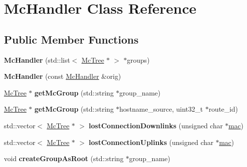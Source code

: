 \hypertarget{classMcHandler}{\section{Mc\-Handler Class Reference}
\label{classMcHandler}
}
\subsection*{Public Member Functions}
\begin{DoxyCompactItemize}
\item 
\hypertarget{classMcHandler_ac3dbc09dc2c3b152e87c59d9570430d8}{{\bfseries Mc\-Handler} (std\-::list$<$ \hyperlink{classMcTree}{Mc\-Tree} $\ast$ $>$ $\ast$groups)}\label{classMcHandler_ac3dbc09dc2c3b152e87c59d9570430d8}

\item 
\hypertarget{classMcHandler_a1f172f102e50907d784ffa319768ded1}{{\bfseries Mc\-Handler} (const \hyperlink{classMcHandler}{Mc\-Handler} \&orig)}\label{classMcHandler_a1f172f102e50907d784ffa319768ded1}

\item 
\hypertarget{classMcHandler_ae675a3ae1b41393e28c4850f76327212}{\hyperlink{classMcTree}{Mc\-Tree} $\ast$ {\bfseries get\-Mc\-Group} (std\-::string $\ast$group\-\_\-name)}\label{classMcHandler_ae675a3ae1b41393e28c4850f76327212}

\item 
\hypertarget{classMcHandler_aa3b39782c75c70c7eede6aed094d3099}{\hyperlink{classMcTree}{Mc\-Tree} $\ast$ {\bfseries get\-Mc\-Group} (std\-::string $\ast$hostname\-\_\-source, uint32\-\_\-t $\ast$route\-\_\-id)}\label{classMcHandler_aa3b39782c75c70c7eede6aed094d3099}

\item 
\hypertarget{classMcHandler_af2bfeebf2808b3242120efabd69ee41e}{std\-::vector$<$ \hyperlink{classMcTree}{Mc\-Tree} $\ast$ $>$ {\bfseries lost\-Connection\-Downlinks} (unsigned char $\ast$\hyperlink{structmac}{mac})}\label{classMcHandler_af2bfeebf2808b3242120efabd69ee41e}

\item 
\hypertarget{classMcHandler_a0b65a26de0e6f2376081f8f7fcd84778}{std\-::vector$<$ \hyperlink{classMcTree}{Mc\-Tree} $\ast$ $>$ {\bfseries lost\-Connection\-Uplinks} (unsigned char $\ast$\hyperlink{structmac}{mac})}\label{classMcHandler_a0b65a26de0e6f2376081f8f7fcd84778}

\item 
\hypertarget{classMcHandler_aa7ef37cbf0d5cd6eaa1d3ba6ab0e8783}{void {\bfseries create\-Group\-As\-Root} (std\-::string $\ast$group\-\_\-name)}\label{classMcHandler_aa7ef37cbf0d5cd6eaa1d3ba6ab0e8783}


\end{DoxyCompactItemize}
